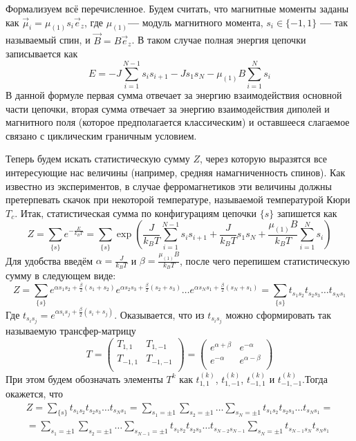 \documentclass[oneside,final,14pt]{extarticle}
\begin{document}
	Формализуем всё перечисленное. Будем считать, что магнитные моменты заданы как $\vec \mu_{i}=\mu_{(1)}s_{i}\vec e_{z}$, где $\mu_{(1)}$\textbf{---} модуль магнитного момента, $s_{i} \in \{-1, 1\}$ \textbf{---} так называемый спин, и $\vec B=B\vec e_{z}$. В таком случае полная энергия цепочки записывается как 
$$E=-J\sum_{i=1}^{N-1}s_{i}s_{i+1}-Js_{1}s_{N}-\mu_{(1)}B\sum_{i=1}^{N}s_{i}$$
	В данной формуле первая сумма отвечает за энергию взаимодействия основной части цепочки, вторая сумма отвечает за энергию взаимодействия диполей и магнитного поля (которое предполагается классическим) и оставшееся слагаемое связано с циклическим граничным условием. 

	Теперь будем искать статистическую сумму $Z$, через которую выразятся все интересующие нас величины (например, средняя намагниченность спинов). Как известно из экспериментов, в случае ферромагнетиков эти величины должны претерпевать скачок при некоторой температуре, называемой температурой Кюри $T_{c}$. Итак, статистическая сумма по конфигурациям цепочки $\{s\}$ запишется как
$$Z=\sum_{\{s\}}e^{-\frac{E}{k_{B}T}}=\sum_{\{s\}}\exp\left(\frac{J}{k_{B}T}\sum_{i=1}^{N-1}s_{i}s_{i+1}+\frac{J}{k_{B}T}s_{1}s_{N}+\frac{\mu_{(1)}B}{k_{B}T}\sum_{i=1}^{N}s_{i}\right)$$
	Для удобства введём $\alpha=\frac{J}{k_{B}T}$ и $\beta=\frac{\mu_{(1)}B}{k_{B}T}$, после чего перепишем статистическую сумму в следующем виде:
$$Z=\sum_{\{s\}}e^{\alpha s_{1}s_{2}+\frac{\beta}{2}(s_{1}+s_{2})}e^{\alpha s_{2}s_{3}+\frac{\beta}{2}(s_{2}+s_{3})}\ldots e^{\alpha s_{N}s_{1}+\frac{\beta}{2}(s_{N}+s_{1})}=\sum_{\{s\}}t_{s_{1}s_{2}}t_{s_{2}s_{3}}\ldots t_{s_{N}s_{1}}$$
	Где $t_{s_{i}s_{j}}=e^{\alpha s_{i}s_{j}+\frac{\beta}{2}(s_{i}+s_{j})}$. Оказывается, что из $t_{s_{i}s_{j}}$ можно сформировать так называемую трансфер-матрицу 
$$T=
\begin{pmatrix}
T_{1, 1} & T_{1, -1} \\
T_{-1, 1} & T_{-1, -1} \\
\end{pmatrix}=
\begin{pmatrix}
e^{\alpha+\beta} & e^{-\alpha} \\
e^{-\alpha} & e^{\alpha-\beta} \\
\end{pmatrix}$$
	При этом будем обозначать элементы $T^{k}$ как $t^{(k)}_{1, 1}$, $t^{(k)}_{1, -1}$, $t^{(k)}_{-1, 1}$ и $t^{(k)}_{-1, -1}$.Тогда окажется, что 
\begin{multline*}
Z=\sum_{\{s\}}t_{s_{1}s_{2}}t_{s_{2}s_{3}}\ldots t_{s_{N}s_{1}}=\sum_{s_{1}=\pm 1}\sum_{s_{2}=\pm 1}\ldots\sum_{s_{N}=\pm 1}t_{s_{1}s_{2}}t_{s_{2}s_{3}}\ldots t_{s_{N}s_{1}}= \\= \sum_{s_{1}=\pm 1}\sum_{s_{2}=\pm 1}\ldots\sum_{s_{N-1}=\pm 1}t_{s_{1}s_{2}}t_{s_{2}s_{3}}\ldots t_{s_{N-2}s_{N-1}}\sum_{s_{N}=\pm 1}t_{s_{N-1}s_{N}}t_{s_{N}s_{1}}
\end{multline*}
\end{document}
